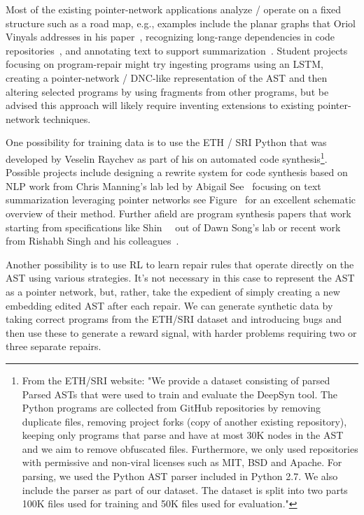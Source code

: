 Most of the existing pointer-network applications analyze / operate on a fixed structure such as a road map, e.g., examples include the planar graphs that Oriol Vinyals addresses in his paper~\cite{VinyalsetalNIPS-15}, recognizing long-range dependencies in code repositories~\cite{BhoopchandetalICLR-17}, and annotating text to support summarization~\cite{SeeetalACL-17}. Student projects focusing on program-repair might try ingesting programs using an LSTM, creating a pointer-network / DNC-like representation of the AST and then altering selected programs by using fragments from other programs, but be advised this approach will likely require inventing extensions to existing pointer-network techniques.

One possibility for training data is to use the ETH / SRI Python {} that was developed by Veselin Raychev as part of his {} on automated code synthesis\footnote{%
%
  From the ETH/SRI website: "We provide a dataset consisting of parsed Parsed ASTs that were used to train and evaluate the DeepSyn tool. The Python programs are collected from GitHub repositories by removing duplicate files, removing project forks (copy of another existing repository), keeping only programs that parse and have at most 30K nodes in the AST and we aim to remove obfuscated files. Furthermore, we only used repositories with permissive and non-viral licenses such as MIT, BSD and Apache. For parsing, we used the Python AST parser included in Python 2.7. We also include the parser as part of our dataset. The dataset is split into two parts \emdash{} 100K files used for training and 50K files used for evaluation."}.
%
Possible projects include designing a rewrite system for code synthesis based on NLP work from Chris Manning's lab led by Abigail See~\cite{SeeetalACL-17} focusing on text summarization leveraging pointer networks \emdash{} see Figure~{} for an excellent schematic overview of their method. Further afield are program synthesis papers that work starting from specifications like Shin~\etal{}~\cite{ShinetalICLR-18b} out of Dawn Song's lab or recent work from Rishabh Singh and his colleagues~\cite{WangetalCoRR-17}.

Another possibility is to use RL to learn repair rules that operate directly on the AST using various strategies. It's not necessary in this case to represent the AST as a pointer network, but, rather, take the expedient of simply creating a new embedding edited AST after each repair. We can generate synthetic data by taking correct programs from the ETH/SRI dataset and introducing bugs and then use these to generate a reward signal, with harder problems requiring two or three separate repairs. 

